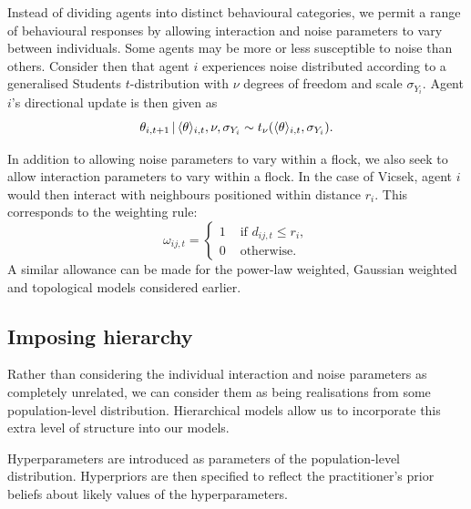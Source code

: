 Instead of dividing agents into distinct behavioural categories, we permit a
range of behavioural responses by allowing interaction and noise parameters to
vary between individuals. Some agents may be more or less susceptible to noise
than others. Consider then that agent $i$ experiences noise distributed
according to a generalised Students $t$-distribution with $\nu$ degrees of
freedom and scale $\sigma_{Y_i}$. Agent $i$'s directional update is then given
as
\begin{equation*}
    \theta_{i,t+1} \,|\, \langle\theta\rangle_{i,t}, \nu, \sigma_{Y_i} \sim
    t_{\nu}(\langle\theta\rangle_{i,t}, \sigma_{Y_i}).
\end{equation*}

In addition to allowing noise parameters to vary within a flock, we also seek
to allow interaction parameters to vary within a flock. In the case of Vicsek,
agent $i$ would then interact with neighbours positioned within distance $r_i$.
This corresponds to the weighting rule:
\begin{equation}
    \omega_{ij,t} =
    \begin{cases}
        1 & \text{ if } d_{ij, t} \leq r_i,\\
        0 & \text{ otherwise.}
    \end{cases}
\end{equation}
A similar allowance can be made for the power-law weighted, Gaussian weighted
and topological models considered earlier.

\subsection{Imposing hierarchy}
\label{ssec:hier_mod}

Rather than considering the individual interaction and noise parameters as
completely unrelated, we can consider them as being realisations from some
population-level distribution. Hierarchical models allow us to incorporate this
extra level of structure into our models.

Hyperparameters are introduced as parameters of the population-level
distribution. Hyperpriors are then specified to reflect the practitioner's
prior beliefs about likely values of the hyperparameters.

